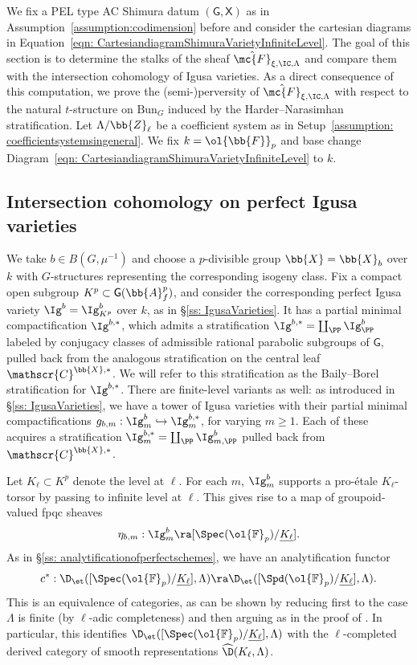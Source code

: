 \documentclass[letterpaper,11pt]{amsart}
\begin{document}
We fix a PEL type AC Shimura datum $(\mathsf{G},\mathsf{X})$ as in Assumption~\ref{assumption:codimension} before and consider the cartesian diagrams in Equation~\eqref{eqn: CartesiandiagramShimuraVarietyInfiniteLevel}. The goal of this section is to determine the stalks of the sheaf $\hat{\mc{F}}_{\xi,\IC,\Lambda}$ and compare them with the intersection cohomology of Igusa varieties. As a direct consequence of this computation, we prove the (semi-)perversity of $\hat{\mc{F}}_{\xi,\IC,\Lambda}$ with respect to the natural $t$-structure on $\mathrm{Bun}_G$ induced by the Harder--Narasimhan stratification. Let $\Lambda/\bb{Z}_\ell$ be a coefficient system as in Setup~\ref{assumption: coefficientsystemsingeneral}. We fix $k=\ol{\bb{F}}_p$ and base change Diagram~\eqref{eqn: CartesiandiagramShimuraVarietyInfiniteLevel} to $k$. 

\subsection{Intersection cohomology on perfect Igusa varieties}{\label{ss: IntCohonPerfectIgusaVarieties}}
We take $b\in B(G,\mu^{-1})$ and choose a $p$-divisible group $\bb{X}=\bb{X}_b$ over $k$ with $G$-structures representing the corresponding isogeny class. Fix a compact open subgroup $K^p\subset \mathsf{G}(\bb{A}_f^p)$, and consider the corresponding perfect Igusa variety $\Ig^b=\Ig^b_{K^p}$ over $k$,  as in \S \ref{ss: IgusaVarieties}. It has a partial minimal compactification $\Ig^{b,\ast}$, which admits a stratification $\Ig^{b,\ast}=\coprod_{\PP}\Ig^b_\PP$ labeled by conjugacy classes of admissible rational parabolic subgroups of $\mathsf{G}$, pulled back from the analogous stratification on the central leaf $\mathscr{C}^{\bb{X},\ast}$. We will refer to this stratification as the Baily--Borel stratification for $\Ig^{b,\ast}$. There are finite-level variants as well: as introduced in \S \ref{ss: IgusaVarieties}, we have a tower of Igusa varieties with their partial minimal compactifications $g_{b,m}: \Ig^{b}_{m} \hookrightarrow \Ig^{b,\ast}_{m}$, for varying $m \geq 1$. Each of these acquires a stratification $\Ig^{b,\ast}_{m}=\coprod_{\PP} \Ig^{b}_{m,\PP}$ pulled back from $\mathscr{C}^{\bb{X},\ast}$. 

Let $K_{\ell} \subset K^{p}$ denote the level at $\ell$. For each $m$, $\Ig^b_m$ supports a pro-\'etale $K_{\ell}$-torsor by passing to infinite level at $\ell$. This gives rise to a map of groupoid-valued fpqc sheaves
\[ \eta_{b,m}: \Ig^{b}_{m} \ra [\Spec(\ol{\mathbb{F}}_{p})/\underline{K_{\ell}}].\]
As in \S \ref{ss: analytificationofperfectschemes}, we have an analytification functor 
\[c^{*}: \D_{\et}([\Spec(\ol{\mathbb{F}}_{p})/\underline{K_{\ell}}],\Lambda) \ra \D_{\et}([\Spd(\ol{\mathbb{F}}_{p})/\underline{K_{\ell}}],\Lambda).\] 
This is an equivalence of categories, as can be shown by reducing first to the case $\Lambda$ is finite (by $\ell$-adic completeness) and then arguing as in the proof of \cite[Lemma 7.1.7]{GHILZIsocComparison}. In particular, this identifies $\D_{\et}([\Spec(\ol{\mathbb{F}}_{p})/\underline{K_{\ell}}],\Lambda)$ with the $\ell$-completed derived category of smooth representations  $\widehat{\D}(K_{\ell},\Lambda)$. 
\end{document}

